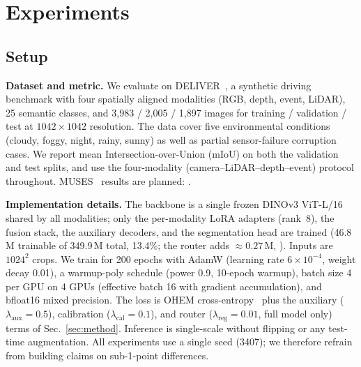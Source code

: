 \section{Experiments}
\label{sec:experiments}

\subsection{Setup}
\label{sec:setup}

\textbf{Dataset and metric.}
We evaluate on DELIVER~\cite{cmnext2023}, a synthetic driving benchmark
with four spatially aligned modalities (RGB, depth, event, LiDAR),
25 semantic classes, and 3{,}983 / 2{,}005 / 1{,}897 images for
training / validation / test at $1042\times1042$ resolution. The data
cover five environmental conditions (cloudy, foggy, night, rainy,
sunny) as well as partial sensor-failure corruption cases. We report
mean Intersection-over-Union (mIoU) on both the validation and test
splits, and use the four-modality (camera--LiDAR--depth--event)
protocol throughout. MUSES~\cite{muses2024} results are planned:
.

\textbf{Implementation details.}
The backbone is a single frozen DINOv3 ViT-L/16~\cite{dinov3_2025}
shared by all modalities; only the per-modality LoRA adapters
(rank~8), the fusion stack, the auxiliary decoders, and the
segmentation head are trained (46.8\,M trainable of 349.9\,M total,
13.4\%; the router adds ${\approx}0.27$\,M, ). Inputs are $1024^2$ crops.
We train for 200 epochs with AdamW (learning rate $6\times10^{-4}$,
weight decay 0.01), a warmup-poly schedule (power 0.9, 10-epoch
warmup), batch size 4 per GPU on 4 GPUs (effective batch 16 with
gradient accumulation), and bfloat16 mixed precision. The loss is
OHEM cross-entropy~\cite{ohem2016} plus the auxiliary
($\lambda_{\mathrm{aux}}{=}0.5$), calibration
($\lambda_{\mathrm{cal}}{=}0.1$), and router
($\lambda_{\mathrm{reg}}{=}0.01$, full model only) terms of
Sec.~\ref{sec:method}. Inference is single-scale without flipping or
any test-time augmentation. All experiments use a single seed (3407);
we therefore refrain from building claims on sub-1-point differences.

